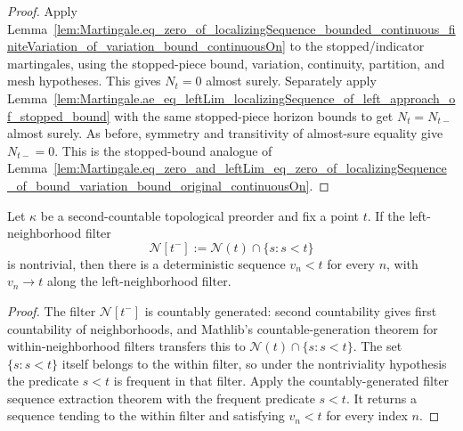 \begin{proof}
Apply
Lemma~\ref{lem:Martingale.eq_zero_of_localizingSequence_bounded_continuous_finiteVariation_of_variation_bound_continuousOn}
to the stopped/indicator martingales, using the stopped-piece bound,
variation, continuity, partition, and mesh hypotheses.  This gives
\(N_t=0\) almost surely.  Separately apply
Lemma~\ref{lem:Martingale.ae_eq_leftLim_localizingSequence_of_left_approach_of_stopped_bound}
with the same stopped-piece horizon bounds to get \(N_t=N_{t-}\) almost
surely.  As before, symmetry and transitivity of almost-sure equality give
\(N_{t-}=0\).  This is the stopped-bound analogue of
Lemma~\ref{lem:Martingale.eq_zero_and_leftLim_eq_zero_of_localizingSequence_of_bound_variation_bound_original_continuousOn}.
\end{proof}

\begin{lemma}\label{lem:Filter.exists_seq_lt_tendsto_nhdsWithin_Iio_of_neBot}
Let \(\kappa\) be a second-countable topological preorder and fix a point
\(t\).  If the left-neighborhood filter
\[
  \mathcal N[t^-] := \mathcal N(t)\cap\{s:s<t\}
\]
is nontrivial, then there is a deterministic sequence \(v_n<t\) for every
\(n\), with \(v_n\to t\) along the left-neighborhood filter.
\end{lemma}

\begin{proof}
The filter \(\mathcal N[t^-]\) is countably generated: second countability
gives first countability of neighborhoods, and Mathlib's
countable-generation theorem for within-neighborhood filters transfers this
to \(\mathcal N(t)\cap\{s:s<t\}\).  The set \(\{s:s<t\}\) itself belongs to
the within filter, so under the nontriviality hypothesis the predicate
\(s<t\) is frequent in that filter.  Apply the countably-generated filter
sequence extraction theorem with the frequent predicate \(s<t\).  It returns
a sequence tending to the within filter and satisfying \(v_n<t\) for every
index \(n\).
\end{proof}

